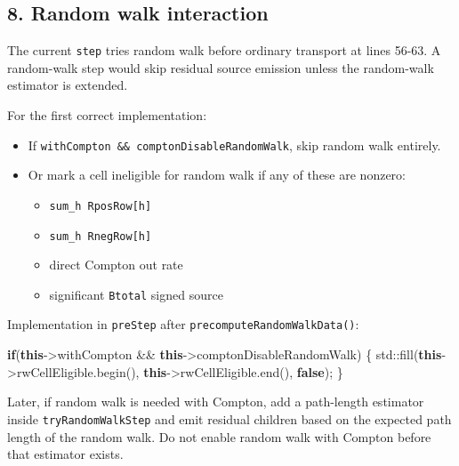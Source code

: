 \documentclass[
]{article}
\newenvironment{Shaded}{}{}
\newcommand{\BuiltInTok}[1]{\textcolor[rgb]{0.00,0.50,0.00}{#1}}
\newcommand{\ControlFlowTok}[1]{\textcolor[rgb]{0.00,0.44,0.13}{\textbf{#1}}}
\newcommand{\KeywordTok}[1]{\textcolor[rgb]{0.00,0.44,0.13}{\textbf{#1}}}
\newcommand{\NormalTok}[1]{#1}
\newcommand{\OperatorTok}[1]{\textcolor[rgb]{0.40,0.40,0.40}{#1}}
\providecommand{\tightlist}{%
  \setlength{\itemsep}{0pt}\setlength{\parskip}{0pt}}
\begin{document}
\subsection{8. Random walk interaction}\label{random-walk-interaction}

The current \texttt{step} tries random walk before ordinary transport at
lines 56-63. A random-walk step would skip residual source emission
unless the random-walk estimator is extended.

For the first correct implementation:

\begin{itemize}
\tightlist
\item
  If \texttt{withCompton\ \&\&\ comptonDisableRandomWalk}, skip random
  walk entirely.
\item
  Or mark a cell ineligible for random walk if any of these are nonzero:

  \begin{itemize}
  \tightlist
  \item
    \texttt{sum\_h\ RposRow{[}h{]}}
  \item
    \texttt{sum\_h\ RnegRow{[}h{]}}
  \item
    direct Compton out rate
  \item
    significant \texttt{Btotal} signed source
  \end{itemize}
\end{itemize}

Implementation in \texttt{preStep} after
\texttt{precomputeRandomWalkData()}:

\begin{Shaded}
\begin{Highlighting}[]
\ControlFlowTok{if}\OperatorTok{(}\KeywordTok{this}\OperatorTok{{-}\textgreater{}}\NormalTok{withCompton }\OperatorTok{\&\&} \KeywordTok{this}\OperatorTok{{-}\textgreater{}}\NormalTok{comptonDisableRandomWalk}\OperatorTok{)}
\OperatorTok{\{}
    \BuiltInTok{std::}\NormalTok{fill}\OperatorTok{(}\KeywordTok{this}\OperatorTok{{-}\textgreater{}}\NormalTok{rwCellEligible}\OperatorTok{.}\NormalTok{begin}\OperatorTok{(),} \KeywordTok{this}\OperatorTok{{-}\textgreater{}}\NormalTok{rwCellEligible}\OperatorTok{.}\NormalTok{end}\OperatorTok{(),} \KeywordTok{false}\OperatorTok{);}
\OperatorTok{\}}
\end{Highlighting}
\end{Shaded}

Later, if random walk is needed with Compton, add a path-length
estimator inside \texttt{tryRandomWalkStep} and emit residual children
based on the expected path length of the random walk. Do not enable
random walk with Compton before that estimator exists.
\end{document}
